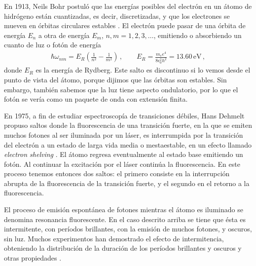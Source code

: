 \documentclass[superscriptaddress,12pt,amsmath]{revtex4-2}
\begin{document}
En 1913, Neils Bohr postul\'o que las energ\'ias posibles del electr\'on en 
un \'atomo de hidr\'ogeno est\'an cuantizadas, es decir, discretizadas, y 
que los electrones se mueven en \'orbitas circulares estables \cite{Bohr13}. 
El electr\'on puede pasar de una \'orbita de energ\'ia $E_n$ a otra de 
energ\'ia $E_m$, $n,m =1,2,3,\ldots$, emitiendo o absorbiendo un cuanto 
de luz o fot\'on de energ\'ia 
%
\begin{eqnarray} 		%
\hbar \omega_{nm} = E_R \left( \frac{1}{n^2} -  \frac{1}{m^2} \right) \,, 
	\qquad 
E_R = \frac{m_e e^4}{8 \epsilon_0^2 h^2 } = 13.60 \,\mathrm{eV} 	\,,
\end{eqnarray}
donde $E_R$ es la energía de Rydberg. Este salto es discontinuo si lo 
vemos desde el punto de vista del átomo, porque dijimos que las órbitas 
son estables. Sin embargo, también sabemos que la luz tiene aspecto 
ondulatorio, por lo que el fotón se vería como un paquete de onda con 
extensión finita. 

En 1975, a fin de estudiar espectroscopía de transiciones débiles, Hans 
Dehmelt \cite{Dehmelt75} propuso saltos donde la fluorescencia de una 
transici\'on fuerte, en la que se emiten muchos fotones al ser iluminada 
por un l\'aser, es interrumpida por la transición del electrón a un estado 
de larga vida media o mestaestable, en un efecto llamado \textit{electron 
shelving} \cite{NaSD86}. El átomo regresa eventualmente al estado base 
emitiendo un fotón. Al continuar la excitaci\'on por el l\'aser contin\'ua la 
fluorescencia. En este proceso tenemos entonces dos saltos: el primero 
consiste en la interrupción abrupta de la fluorescencia de la transición 
fuerte, y el segundo en el retorno a la fluorescencia. 

El proceso de emisi\'on espont\'anea de fotones mientras el \'atomo es 
iluminado se denomina resonancia fluorescente. En el caso descrito 
arriba se tiene que \'esta es intermitente, con per\'iodos brillantes, con la 
emisi\'on de muchos fotones, y oscuros, sin luz. Muchos experimentos 
han demostrado el efecto de intermitencia, obteniendo la distribuci\'on 
de la duraci\'on de los per\'iodos brillantes y oscuros y otras propiedades 
\cite{NaSD86,SNBT86,BHIW86,PlKn98,BuTa00}. 
\end{document}
